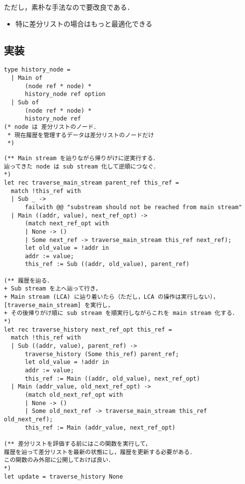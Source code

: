 \documentclass[10pt, a4j, twocolumn]{scrartcl}
\begin{document}
ただし，素朴な手法なので要改良である．
\begin{itemize}
\item 特に差分リストの場合はもっと最適化できる
\end{itemize}


\subsection{実装}
\label{sec:org99d0e50}

\begin{lstlisting}
type history_node =
  | Main of
      (node ref * node) *
      history_node ref option
  | Sub of
      (node ref * node) *
      history_node ref
(* node は 差分リストのノード．
 * 現在履歴を管理するデータは差分リストのノードだけ
 *)
\end{lstlisting}


\begin{lstlisting}
(** Main stream を辿りながら帰りがけに逆実行する．
辿ってきた node は sub stream 化して逆順につなぐ．
*)
let rec traverse_main_stream parent_ref this_ref =
  match !this_ref with
  | Sub _ -> 
      failwith @@ "substream should not be reached from main stream"
  | Main ((addr, value), next_ref_opt) ->
      (match next_ref_opt with
      | None -> ()
      | Some next_ref -> traverse_main_stream this_ref next_ref);
      let old_value = !addr in
      addr := value;
      this_ref := Sub ((addr, old_value), parent_ref)

(** 履歴を辿る．
+ Sub stream を上へ辿って行き，
+ Main stream (LCA) に辿り着いたら（ただし，LCA の操作は実行しない），[traverse_main_stream] を実行し，
+ その後帰りがけ順に sub stream を順実行しながらこれを main stream 化する．
*)
let rec traverse_history next_ref_opt this_ref =
  match !this_ref with
  | Sub ((addr, value), parent_ref) ->
      traverse_history (Some this_ref) parent_ref;
      let old_value = !addr in
      addr := value;
      this_ref := Main ((addr, old_value), next_ref_opt)
  | Main (addr_value, old_next_ref_opt) ->
      (match old_next_ref_opt with
      | None -> ()
      | Some old_next_ref -> traverse_main_stream this_ref old_next_ref);
      this_ref := Main (addr_value, next_ref_opt)

(** 差分リストを評価する前にはこの関数を実行して，
履歴を辿って差分リストを最新の状態にし，履歴を更新する必要がある．
この関数のみ外部に公開しておけば良い．
*)
let update = traverse_history None
\end{lstlisting}
\end{document}

